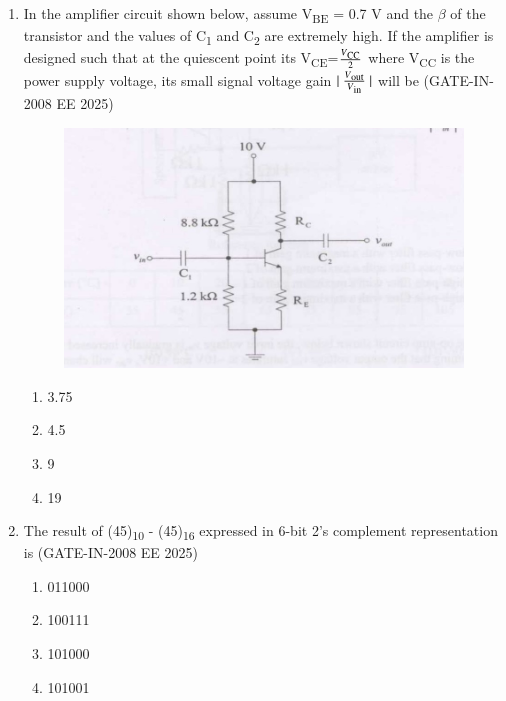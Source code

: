 \documentclass[journal,12pt,onecolumn]{IEEEtran}
\theoremstyle{remark}
\begin{document}
\begin{enumerate}[label=Q.\arabic*,start=1]
    \item  In the amplifier circuit shown below, assume V\textsubscript{BE} = 0.7 V and the $\beta$ of the transistor and the values
of C\textsubscript{1} and C\textsubscript{2} are extremely high. If the amplifier is designed such that at the quiescent point its V\textsubscript{CE}=\(\frac{V\textsubscript{CC}}{2}\) where V\textsubscript{CC}  is the power supply voltage, its small signal voltage gain $\lvert \ \frac{V\textsubscript{out}}{V\textsubscript{in}}\  \rvert$ will be (GATE-IN-2008 EE 2025)
\begin{figure}[H]
    \centering
    \includegraphics[width=0.5\linewidth]{figs/i22.jpg}
    \label{fig:placeholder22}
\end{figure}
    \begin{enumerate} 
        \item 3.75
        \item  4.5
        \item  9
        \item 19
    \end{enumerate}
    
    \item The result of (45)\textsubscript{10} - (45)\textsubscript{16} expressed in 6-bit 2's complement representation is (GATE-IN-2008 EE 2025)
    \begin{enumerate} 
        \item 011000
        \item 100111
        \item 101000
        \item 101001
    \end{enumerate}
    

\end{enumerate}
\end{document}
